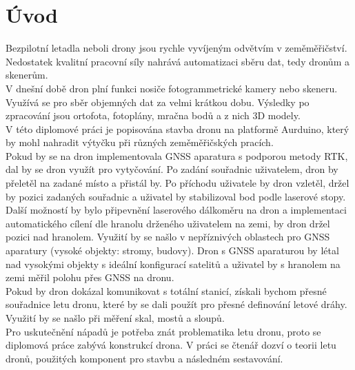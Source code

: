 \chapter{Úvod}
\label{0-uvod}


Bezpilotní letadla neboli drony jsou rychle vyvíjeným odvětvím v zeměměřičství. Nedostatek kvalitní pracovní síly nahrává automatizaci sběru dat, tedy dronům a skenerům.\\
V dnešní době dron plní funkci nosiče fotogrammetrické kamery nebo skeneru. Využívá se pro sběr objemných dat za velmi krátkou dobu. Výsledky po zpracování jsou ortofota, fotoplány, mračna bodů a z nich 3D modely.\\
V této diplomové práci je popisována stavba dronu na platformě Aurduino, který by mohl nahradit výtyčku při různých zeměměřičských pracích.\\
Pokud by se na dron implementovala GNSS aparatura s podporou metody RTK, dal by se dron využít pro vytyčování. Po zadání souřadnic uživatelem, dron by přeletěl na zadané místo a přistál by. Po příchodu uživatele by dron vzletěl, držel by pozici zadaných souřadnic a uživatel by stabilizoval bod podle laserové stopy.\\
Další možností by bylo připevnění laserového dálkoměru na dron a implementaci automatického cílení dle hranolu drženého uživatelem na zemi, by dron držel pozici nad hranolem. Využití by se našlo v nepříznivých oblastech pro GNSS aparatury (vysoké objekty: stromy, budovy). Dron s GNSS aparaturou by létal nad vysokými objekty s ideální konfigurací satelitů a uživatel by s hranolem na zemi měřil polohu přes GNSS na dronu.\\
Pokud by dron dokázal komunikovat s totální stanicí, získali bychom přesné souřadnice letu dronu, které by se dali použít pro přesné definování letové dráhy. Využití by se našlo při měření skal, mostů a sloupů.\\
Pro uskutečnění nápadů je potřeba znát problematika letu dronu, proto se diplomová práce zabývá konstrukcí drona. V práci se čtenář dozví o teorii letu dronů, použitých komponent pro stavbu a následném sestavování.\\

